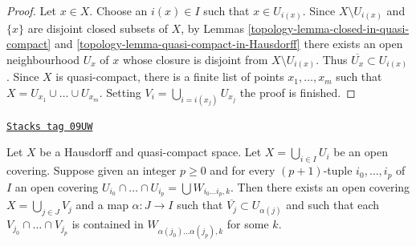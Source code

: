 \begin{proof}

Let $x \in X$. Choose an $i(x) \in I$ such that $x \in U_{i(x)}$.
Since $X \setminus U_{i(x)}$ and $\{x\}$ are disjoint closed
subsets of $X$, by Lemmas \ref{topology-lemma-closed-in-quasi-compact} and
\ref{topology-lemma-quasi-compact-in-Hausdorff}
there exists an open neighbourhood $U_x$ of $x$
whose closure is disjoint from $X \setminus U_{i(x)}$.
Thus $\overline{U_x} \subset U_{i(x)}$. Since $X$ is quasi-compact,
there is a finite list of points $x_1, \ldots, x_m$ such that
$X = U_{x_1} \cup \ldots \cup U_{x_m}$. Setting
$V_i = \bigcup_{i = i(x_j)} U_{x_j}$ the proof is finished.
\end{proof}

\begin{lemma}
\label{topology-lemma-refine-covering}
\href{https://stacks.math.columbia.edu/tag/09UW}{\texttt{Stacks tag 09UW}}

Let $X$ be a Hausdorff and quasi-compact space.
Let $X = \bigcup_{i \in I} U_i$ be an open covering.
Suppose given an integer $p \geq 0$ and for every $(p + 1)$-tuple
$i_0, \ldots, i_p$ of $I$ an open covering
$U_{i_0} \cap \ldots \cap U_{i_p} = \bigcup W_{i_0 \ldots i_p, k}$.
Then there exists an open covering $X = \bigcup_{j \in J} V_j$
and a map $\alpha : J \to I$ such that $\overline{V_j} \subset U_{\alpha(j)}$
and such that each $V_{j_0} \cap \ldots \cap V_{j_p}$
is contained in $W_{\alpha(j_0) \ldots \alpha(j_p), k}$
for some $k$.
\end{lemma}

